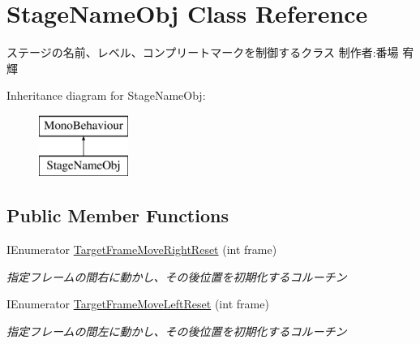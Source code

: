 \hypertarget{class_stage_name_obj}{}\section{Stage\+Name\+Obj Class Reference}
\label{class_stage_name_obj}


ステージの名前、レベル、コンプリートマークを制御するクラス 制作者\+:番場 宥輝  


Inheritance diagram for Stage\+Name\+Obj\+:\begin{figure}[H]
\begin{center}
\leavevmode
\includegraphics[height=2.000000cm]{class_stage_name_obj}
\end{center}
\end{figure}
\subsection*{Public Member Functions}
\begin{DoxyCompactItemize}
\item 
I\+Enumerator \hyperlink{class_stage_name_obj_add4c09db609363dcfc655a0182b7bc8b}{Target\+Frame\+Move\+Right\+Reset} (int frame)
\begin{DoxyCompactList}\small\item\em 指定フレームの間右に動かし、その後位置を初期化するコルーチン \end{DoxyCompactList}\item 
I\+Enumerator \hyperlink{class_stage_name_obj_a7dd04a5c3dd0db6836a15c1c508dcecf}{Target\+Frame\+Move\+Left\+Reset} (int frame)
\begin{DoxyCompactList}\small\item\em 指定フレームの間左に動かし、その後位置を初期化するコルーチン \end{DoxyCompactList}\end{DoxyCompactItemize}
